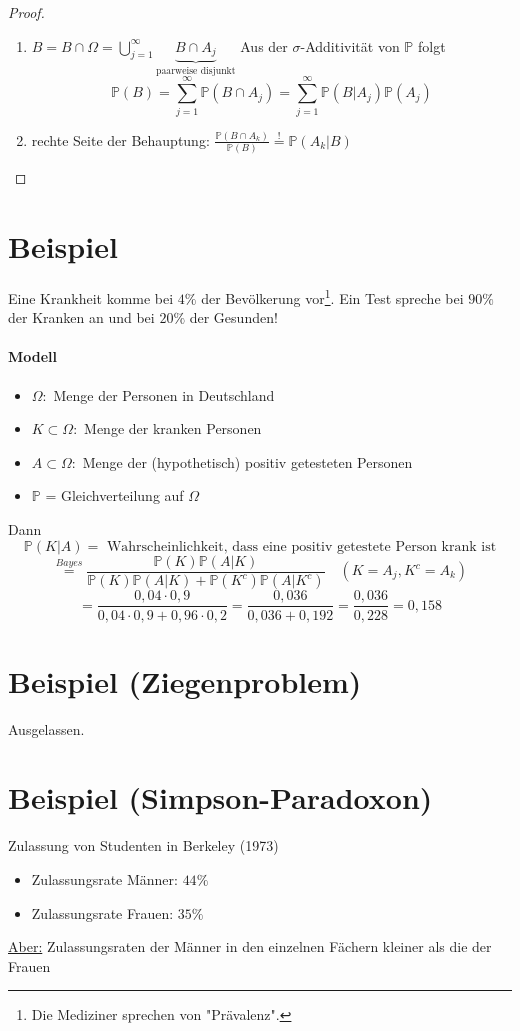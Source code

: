 \documentclass[a4paper,11pt,notitlepage]{report}
\newcommand{\Prim}{{\ensuremath{\mathbb{P}}}}
\begin{document}
\begin{proof}
	\begin{enumerate}
		\item $B = B \cap \Omega = \bigcup\limits_{j=1}^\infty{\underbrace{B \cap A_j}_{\text{paarweise disjunkt}}}$ 
		Aus der $\sigma$-Additivität von $\Prim$ folgt
		$$\Prim(B)=\sum\limits_{j=1}^\infty{\Prim(B \cap A_j)} = \sum\limits_{j=1}^\infty{\Prim(B|A_j)\Prim(A_j)}$$
		\item rechte Seite der Behauptung: $\frac{\Prim(B \cap A_k)}{\Prim(B)} \overset{!}{=} \Prim(A_k|B)$
	\end{enumerate}
\end{proof}

\section{Beispiel}
Eine Krankheit komme bei $4 \%$ der Bevölkerung vor\footnote{Die Mediziner sprechen von "Prävalenz".}. Ein Test spreche bei $90 \%$ der Kranken an und bei $20 \%$ der Gesunden!
\paragraph{Modell}
\begin{itemize}
	\item $\Omega :$ Menge der Personen in Deutschland
	\item $K \subset \Omega :$ Menge der kranken Personen
	\item $A \subset \Omega :$ Menge der (hypothetisch) positiv getesteten Personen
	\item $\Prim$ = Gleichverteilung auf $\Omega$
\end{itemize}

Dann 
$$\Prim(K|A)=\text{ Wahrscheinlichkeit, dass eine positiv getestete Person krank ist}$$
$$\overset{Bayes}{=} \frac{\Prim(K)\Prim(A|K)}{\Prim(K)\Prim(A|K) + \Prim(K^c)\Prim(A|K^c)} \quad (K = A_j, K^c = A_k)$$
$$= \frac{0,04 \cdot 0,9}{0,04 \cdot 0,9 + 0,96 \cdot 0,2} = \frac{0,036}{0,036 + 0,192} = \frac{0,036}{0,228} = 0,158$$

\section{Beispiel (Ziegenproblem)} Ausgelassen.

\section{Beispiel (Simpson-Paradoxon)}
Zulassung von Studenten in Berkeley (1973)
\begin{itemize}
	\item Zulassungsrate Männer: $44 \%$
	\item Zulassungsrate Frauen: $35 \%$
\end{itemize}
\underline{Aber:} Zulassungsraten der Männer in den einzelnen Fächern kleiner als die der Frauen
\end{document}
